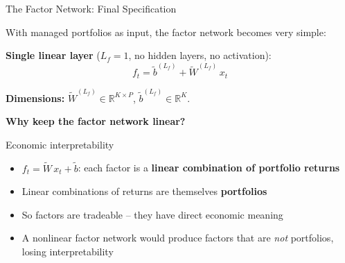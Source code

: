 \documentclass[aspectratio=169]{beamer}
\newcommand{\R}{\mathbb{R}}
\begin{document}
\begin{frame}{The Factor Network: Final Specification}

With managed portfolios as input, the factor network becomes very simple:

\vspace{0.5em}
\textbf{Single linear layer} ($L_f = 1$, no hidden layers, no activation):
\[
f_t = \tilde{b}^{(L_f)} + \tilde{W}^{(L_f)}\, x_t
\]

\textbf{Dimensions:} $\tilde{W}^{(L_f)} \in \R^{K \times P}$, $\tilde{b}^{(L_f)} \in \R^K$.

\vspace{0.5em}
\textbf{Why keep the factor network linear?}

\begin{exampleblock}{Economic interpretability}
\begin{itemize}
    \item $f_t = \tilde{W}\, x_t + \tilde{b}$: each factor is a \textbf{linear combination of portfolio returns}
    \item Linear combinations of returns are themselves \textbf{portfolios}
    \item So factors are tradeable -- they have direct economic meaning
    \item A nonlinear factor network would produce factors that are \emph{not} portfolios, losing interpretability
\end{itemize}
\end{exampleblock}
\end{frame}
%
\end{document}
